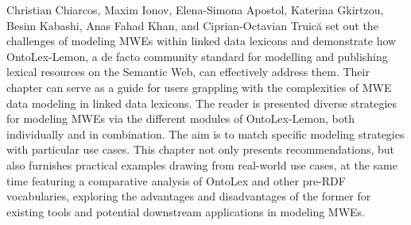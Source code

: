 \begin{refsection}
Christian Chiarcos, Maxim Ionov, Elena-Simona Apostol, Katerina Gkirtzou, Besim Kabashi, Anas Fahad Khan, and Ciprian-Octavian Truică set out the challenges of modeling MWEs within linked data lexicons and demonstrate how OntoLex-Lemon, a de facto community standard for modelling and publishing lexical resources on the Semantic Web, can effectively address them. Their chapter can serve as a guide for users grappling with the complexities of MWE data modeling in linked data lexicons. The reader is presented diverse strategies for modeling MWEs via the different modules of OntoLex-Lemon, both individually and in combination. The aim is to match specific modeling strategies with particular use cases. This chapter not only presents recommendations, but also furnishes practical examples drawing from real-world use cases, %
at the same time featuring a comparative analysis of OntoLex and other pre-RDF vocabularies, exploring the advantages and disadvantages of the former for existing tools and potential downstream applications in modeling MWEs.


\end{refsection}
